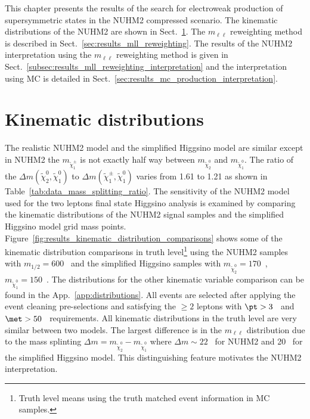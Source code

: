 This chapter presents the results of the search for electroweak production of supersymmetric states in the NUHM2 compressed scenario.
The kinematic distributions of the NUHM2 are shown in Sect.~\ref{sec:results_kinematic_distributions}.
The $m_{\ell \ell}$ reweighting method is described in Sect.~\ref{sec:results_mll_reweighting}.
The results of the NUHM2 interpretation using the $m_{\ell \ell}$ reweighting method is given in Sect.~\ref{subsec:results_mll_reweighting_interpretation} and the interpretation using MC is detailed in Sect.~\ref{sec:results_mc_production_interpretation}.


\section{Kinematic distributions}
\label{sec:results_kinematic_distributions}
The realistic NUHM2 model and the simplified Higgsino model are similar except in NUHM2 the $m_{\widetilde{\chi}^{\pm}_{1}}$ is not exactly half way between $m_{\widetilde{\chi}^{0}_{2}}$ and $m_{\widetilde{\chi}^{0}_{1}}$.
The ratio of the $\Delta m(\widetilde{\chi}^{0}_{2}, \widetilde{\chi}^{0}_{1})$ to $\Delta m(\widetilde{\chi}^{\pm}_{1}, \widetilde{\chi}^{0}_{1})$ varies from 1.61 to 1.21 as shown in Table~\ref{tab:data_mass_splitting_ratio}.
The sensitivity of the NUHM2 model used for the two leptons final state Higgsino analysis is examined by comparing the kinematic distributions of the NUHM2 signal samples and the simplified Higgsino model grid mass points.
Figure~\ref{fig:results_kinematic_distribution_comparisons} shows some of the kinematic distribution comparisons in truth level\footnote{Truth level means using the truth matched event information in MC samples.} using the NUHM2 samples with $m_{1/2} = 600$~{\GeV} and the simplified Higgsino samples with $m_{\widetilde{\chi}^{0}_{2}} = 170$~{\GeV}, $m_{\widetilde{\chi}^{0}_{1}} = 150$~{\GeV}.
The distributions for the other kinematic variable comparison can be found in the App.~\ref{app:distributions}.
All events are selected after applying the event cleaning pre-selections and satisfying the $\ge 2$ leptons with $\pt > 3$~{\GeV} and $\met > 50$~{\GeV} requirements.
All kinematic distributions in the truth level are very similar between two models.
The largest difference is in the $m_{\ell \ell}$ distribution due to the mass splinting $\Delta m = m_{\widetilde{\chi}^{0}_{2}} - m_{\widetilde{\chi}^{0}_{1}}$ where $\Delta m \sim 22$~{\GeV} for NUHM2 and 20~{\GeV} for the simplified Higgsino model.
This distinguishing feature motivates the NUHM2 interpretation.

